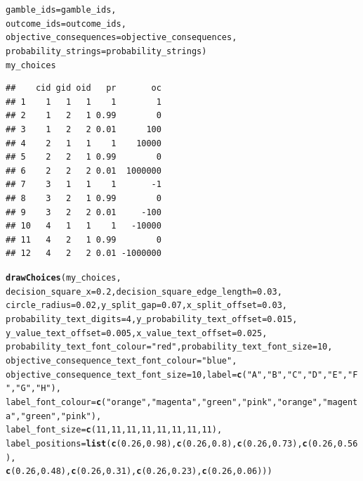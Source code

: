\documentclass{article}\usepackage[]{graphicx}\usepackage[]{color}
\makeatletter
\newcommand{\hlnum}[1]{\textcolor[rgb]{0.686,0.059,0.569}{#1}}%
\newcommand{\hlstr}[1]{\textcolor[rgb]{0.192,0.494,0.8}{#1}}%
\newcommand{\hlstd}[1]{\textcolor[rgb]{0.345,0.345,0.345}{#1}}%
\newcommand{\hlkwc}[1]{\textcolor[rgb]{0.333,0.667,0.333}{#1}}%
\newcommand{\hlkwd}[1]{\textcolor[rgb]{0.737,0.353,0.396}{\textbf{#1}}}%
\newenvironment{kframe}{%
 \def\at@end@of@kframe{}%
 \ifinner\ifhmode%
  \def\at@end@of@kframe{\end{minipage}}%
  \begin{minipage}{\columnwidth}%
 \fi\fi%
 \def\FrameCommand##1{\hskip\@totalleftmargin \hskip-\fboxsep
 \colorbox{shadecolor}{##1}\hskip-\fboxsep
     \hskip-\linewidth \hskip-\@totalleftmargin \hskip\columnwidth}%
 \MakeFramed {\advance\hsize-\width
   \@totalleftmargin\z@ \linewidth\hsize
   \@setminipage}}%
 {\par\unskip\endMakeFramed%
 \at@end@of@kframe}
\newenvironment{knitrout}{}{} %
\makeatother
\begin{document}
\begin{knitrout}
\begin{kframe}
\begin{alltt}
        \hlkwc{gamble_ids}\hlstd{=gamble_ids,}
        \hlkwc{outcome_ids}\hlstd{=outcome_ids,}
        \hlkwc{objective_consequences}\hlstd{=objective_consequences,}
        \hlkwc{probability_strings}\hlstd{=probability_strings)}
\hlstd{my_choices}
\end{alltt}
\begin{verbatim}
##    cid gid oid   pr       oc
## 1    1   1   1    1        1
## 2    1   2   1 0.99        0
## 3    1   2   2 0.01      100
## 4    2   1   1    1    10000
## 5    2   2   1 0.99        0
## 6    2   2   2 0.01  1000000
## 7    3   1   1    1       -1
## 8    3   2   1 0.99        0
## 9    3   2   2 0.01     -100
## 10   4   1   1    1   -10000
## 11   4   2   1 0.99        0
## 12   4   2   2 0.01 -1000000
\end{verbatim}
\begin{alltt}
\hlkwd{drawChoices}\hlstd{(my_choices,}
        \hlkwc{decision_square_x}\hlstd{=}\hlnum{0.2}\hlstd{,} \hlkwc{decision_square_edge_length}\hlstd{=}\hlnum{0.03}\hlstd{,}
        \hlkwc{circle_radius}\hlstd{=}\hlnum{0.02}\hlstd{,} \hlkwc{y_split_gap}\hlstd{=}\hlnum{0.07}\hlstd{,} \hlkwc{x_split_offset}\hlstd{=}\hlnum{0.03}\hlstd{,}
        \hlkwc{probability_text_digits}\hlstd{=}\hlnum{4}\hlstd{,} \hlkwc{y_probability_text_offset}\hlstd{=}\hlnum{0.015}\hlstd{,}
        \hlkwc{y_value_text_offset}\hlstd{=}\hlnum{0.005}\hlstd{,} \hlkwc{x_value_text_offset}\hlstd{=}\hlnum{0.025}\hlstd{,}
        \hlkwc{probability_text_font_colour}\hlstd{=}\hlstr{"red"}\hlstd{,} \hlkwc{probability_text_font_size}\hlstd{=}\hlnum{10}\hlstd{,}
        \hlkwc{objective_consequence_text_font_colour}\hlstd{=}\hlstr{"blue"}\hlstd{,}
        \hlkwc{objective_consequence_text_font_size}\hlstd{=}\hlnum{10}\hlstd{,} \hlkwc{label}\hlstd{=}\hlkwd{c}\hlstd{(}\hlstr{"A"}\hlstd{,}\hlstr{"B"}\hlstd{,}\hlstr{"C"}\hlstd{,}\hlstr{"D"}\hlstd{,}\hlstr{"E"}\hlstd{,}\hlstr{"F"}\hlstd{,}\hlstr{"G"}\hlstd{,}\hlstr{"H"}\hlstd{),}
        \hlkwc{label_font_colour}\hlstd{=}\hlkwd{c}\hlstd{(}\hlstr{"orange"}\hlstd{,}\hlstr{"magenta"}\hlstd{,}\hlstr{"green"}\hlstd{,}\hlstr{"pink"}\hlstd{,}\hlstr{"orange"}\hlstd{,}\hlstr{"magenta"}\hlstd{,}\hlstr{"green"}\hlstd{,}\hlstr{"pink"}\hlstd{),}
        \hlkwc{label_font_size}\hlstd{=}\hlkwd{c}\hlstd{(}\hlnum{11}\hlstd{,}\hlnum{11}\hlstd{,}\hlnum{11}\hlstd{,}\hlnum{11}\hlstd{,}\hlnum{11}\hlstd{,}\hlnum{11}\hlstd{,}\hlnum{11}\hlstd{,}\hlnum{11}\hlstd{),}
        \hlkwc{label_positions}\hlstd{=}\hlkwd{list}\hlstd{(}\hlkwd{c}\hlstd{(}\hlnum{0.26}\hlstd{,}\hlnum{0.98}\hlstd{),}\hlkwd{c}\hlstd{(}\hlnum{0.26}\hlstd{,}\hlnum{0.8}\hlstd{),}\hlkwd{c}\hlstd{(}\hlnum{0.26}\hlstd{,}\hlnum{0.73}\hlstd{),}\hlkwd{c}\hlstd{(}\hlnum{0.26}\hlstd{,}\hlnum{0.56}\hlstd{),}
                \hlkwd{c}\hlstd{(}\hlnum{0.26}\hlstd{,}\hlnum{0.48}\hlstd{),}\hlkwd{c}\hlstd{(}\hlnum{0.26}\hlstd{,}\hlnum{0.31}\hlstd{),}\hlkwd{c}\hlstd{(}\hlnum{0.26}\hlstd{,}\hlnum{0.23}\hlstd{),}\hlkwd{c}\hlstd{(}\hlnum{0.26}\hlstd{,}\hlnum{0.06}\hlstd{)))}
\end{alltt}
\end{kframe}


\end{knitrout}
\end{document}

